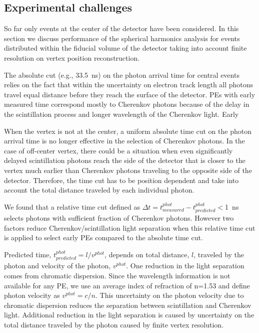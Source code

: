 \subsection{Experimental challenges}

So far only events at the center of the detector have been
considered. In this section we discuss performance of the spherical
harmonics analysis for events distributed within the fiducial volume
of the detector taking into account finite resolution on vertex
position reconstruction.

The absolute cut (e.g., 33.5~ns) on the photon arrival time for central events relies on the fact that within the uncertainty on electron track length all photons travel equal distance before they reach the surface of the detector. PEs with early measured time correspond mostly to Cherenkov photons because of the delay in the scintillation process and longer wavelength of the Cherenkov light. Early 

When the vertex is not at the center, a uniform absolute time cut on the photon
arrival time is no longer effective in the selection of Cherenkov
photons. In the case of off-center vertex, there could be a situation when even significantly delayed scintillation photons reach the side of the detector that is
closer to the vertex much earlier than Cherenkov photons traveling to
the opposite side of the detector. Therefore, the time cut has to be
position dependent and take into account the total distance traveled
by each individual photon.

We found that a relative time cut defined as $\Delta t=t^{phot}_{measured} -
t^{phot}_{predicted}<$1~ns selects photons with sufficient fraction of
Cherenkov photons. However two factors reduce Cherenkov/scintillation light separation when this relative time cut is applied to select early PEs compared to the absolute time cut.

Predicted time, $ t^{phot}_{predicted}=l/v^{phot}$, depends on total distance, $l$, traveled by the photon and velocity of the photon, $v^{phot}$. One reduction in the light separation comes from chromatic dispersion. Since the wavelength information is not available for any PE, we use an average index of refraction of n=1.53 and define photon velocity as $v^{phot} = c/n$. This uncertainty on the photon velocity due to chromatic dispersion reduces the separation between scintillation and Cherenkov light. Additional reduction in the light separation is caused by uncertainty on the total distance traveled by the photon caused by finite vertex resolution.

